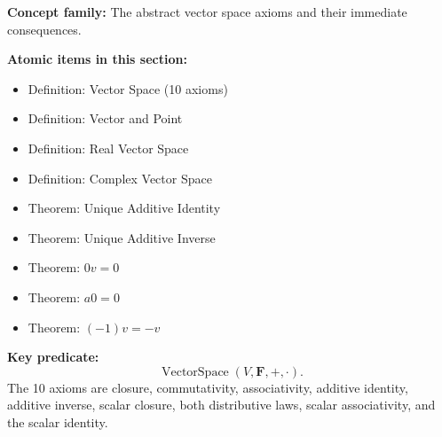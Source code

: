 
\begin{tcolorbox}[colback=gray!6, colframe=gray!40, arc=2pt,
  left=6pt, right=6pt, top=4pt, bottom=4pt,
  title={\small\textbf{Toolkit --- Vector Spaces}},
  fonttitle=\small\bfseries]
\textbf{Concept family:} The abstract vector space axioms and their immediate
consequences.

\medskip
\textbf{Atomic items in this section:}
\begin{itemize}
  \item Definition: Vector Space (10 axioms)
  \item Definition: Vector and Point
  \item Definition: Real Vector Space
  \item Definition: Complex Vector Space
  \item Theorem: Unique Additive Identity
  \item Theorem: Unique Additive Inverse
  \item Theorem: $0v = 0$
  \item Theorem: $a0 = 0$
  \item Theorem: $(-1)v = -v$
\end{itemize}

\medskip
\textbf{Key predicate:}
\[
  \operatorname{VectorSpace}(V, \mathbf{F}, +, \cdot).
\]
The 10 axioms are closure, commutativity, associativity, additive identity,
additive inverse, scalar closure, both distributive laws, scalar associativity,
and the scalar identity.
\end{tcolorbox}


